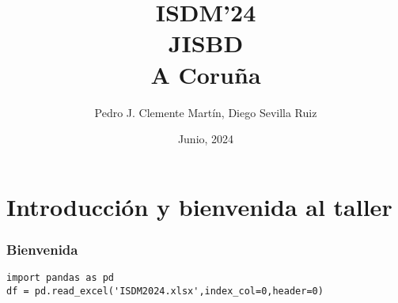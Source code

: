 
\usepackage{arydshln}


\title[ISDM'24, JISBD, A Coruña]{ISDM'24\\JISBD\\A Coruña}

\author{Pedro J. Clemente Martín, Diego Sevilla Ruiz}
\date{Junio, 2024}



\def\insertsectionnumber{\arabic{section}}
\def\insertsubsectionnumber{\arabic{subsection}}



\begin{frame}
  \titlepage
\end{frame}

\section{Introducción y bienvenida al taller}

\begin{frame}[fragile]
\frametitle{Bienvenida}

\begin{lstlisting}
import pandas as pd
df = pd.read_excel('ISDM2024.xlsx',index_col=0,header=0)
\end{lstlisting}

\end{frame}







